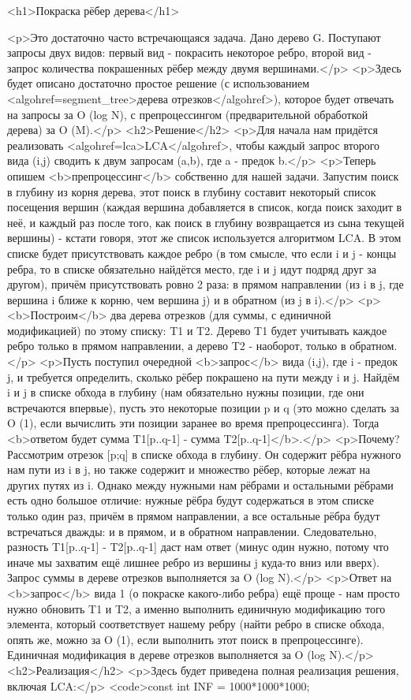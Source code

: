 <h1>Покраска рёбер дерева</h1>

<p>Это достаточно часто встречающаяся задача. Дано дерево G. Поступают запросы двух видов: первый вид - покрасить некоторое ребро, второй вид - запрос количества покрашенных рёбер между двумя вершинами.</p>
<p>Здесь будет описано достаточно простое решение (с использованием <algohref=segment_tree>дерева отрезков</algohref>), которое будет отвечать на запросы за O (log N), с препроцессингом (предварительной обработкой дерева) за O (M).</p>
<h2>Решение</h2>
<p>Для начала нам придётся реализовать <algohref=lca>LCA</algohref>, чтобы каждый запрос второго вида (i,j) сводить к двум запросам (a,b), где a - предок b.</p>
<p>Теперь опишем <b>препроцессинг</b> собственно для нашей задачи. Запустим поиск в глубину из корня дерева, этот поиск в глубину составит некоторый список посещения вершин (каждая вершина добавляется в список, когда поиск заходит в неё, и каждый раз после того, как поиск в глубину возвращается из сына текущей вершины) - кстати говоря, этот же список используется алгоритмом LCA. В этом списке будет присутствовать каждое ребро (в том смысле, что если i и j - концы ребра, то в списке обязательно найдётся место, где i и j идут подряд друг за другом), причём присутствовать ровно 2 раза: в прямом направлении (из i в j, где вершина i ближе к корню, чем вершина j) и в обратном (из j в i).</p>
<p><b>Построим</b> два дерева отрезков (для суммы, с единичной модификацией) по этому списку: T1 и T2. Дерево T1 будет учитывать каждое ребро только в прямом направлении, а дерево T2 - наоборот, только в обратном.</p>
<p>Пусть поступил очередной <b>запрос</b> вида (i,j), где i - предок j, и требуется определить, сколько рёбер покрашено на пути между i и j. Найдём i и j в списке обхода в глубину (нам обязательно нужны позиции, где они встречаются впервые), пусть это некоторые позиции p и q (это можно сделать за O (1), если вычислить эти позиции заранее во время препроцессинга). Тогда <b>ответом будет сумма T1[p..q-1] - сумма T2[p..q-1]</b>.</p>
<p>Почему? Рассмотрим отрезок [p;q] в списке обхода в глубину. Он содержит рёбра нужного нам пути из i в j, но также содержит и множество рёбер, которые лежат на других путях из i. Однако между нужными нам рёбрами и остальными рёбрами есть одно большое отличие: нужные рёбра будут содержаться в этом списке только один раз, причём в прямом направлении, а все остальные рёбра будут встречаться дважды: и в прямом, и в обратном направлении. Следовательно, разность T1[p..q-1] - T2[p..q-1] даст нам ответ (минус один нужно, потому что иначе мы захватим ещё лишнее ребро из вершины j куда-то вниз или вверх). Запрос суммы в дереве отрезков выполняется за O (log N).</p>
<p>Ответ на <b>запрос</b> вида 1 (о покраске какого-либо ребра) ещё проще - нам просто нужно обновить T1 и T2, а именно выполнить единичную модификацию того элемента, который соответствует нашему ребру (найти ребро в списке обхода, опять же, можно за O (1), если выполнить этот поиск в препроцессинге). Единичная модификация в дереве отрезков выполняется за O (log N).</p>
<h2>Реализация</h2>
<p>Здесь будет приведена полная реализация решения, включая LCA:</p>
<code>const int INF = 1000*1000*1000;

